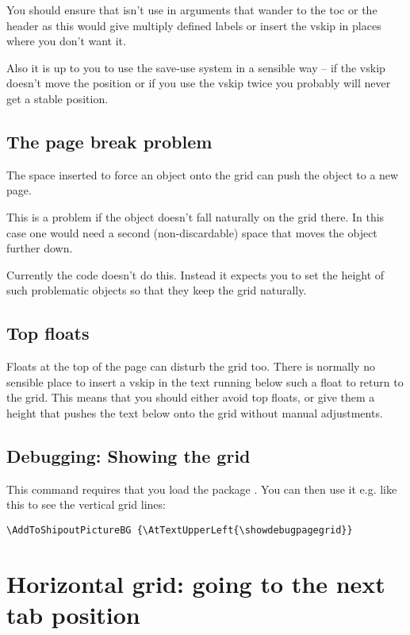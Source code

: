 \documentclass[twoside,parskip=half-,fontsize=12pt,egregdoesnotlikesansseriftitles,headings=normal]{scrartcl}
\begin{document}
You should ensure that  isn't use in arguments that wander to the toc or the header as this would give multiply defined labels or insert the vskip in places where you don't want it.

Also it is up to you to use the save-use system in a sensible way -- if the vskip doesn't move the position or if you use the vskip twice you probably will never get a stable position.

\subsection{The page break problem}\label{sec:pagebreak}

The space inserted to force an object onto the grid can push the object to a new page.

This is a problem if the object doesn't fall naturally on the grid there. In this case one would need a second (non-discardable) space that moves the object further down.

Currently the code doesn't do this. Instead it expects you to set the height of such problematic objects so that they keep the grid naturally.


\subsection{Top floats}

Floats at the top of the page can disturb the grid too.  There is normally no sensible place to insert a vskip in the text running below such a float to return to the grid. This means that you should either avoid top floats, or give them a height that pushes the text below onto the grid without manual adjustments.

\subsection{Debugging: Showing the grid}

\DescribeMacro\showdebugpagegrid

This command requires that you load the package . You can then use it e.g. like this to see the vertical grid lines:

\begin{lstlisting}
\AddToShipoutPictureBG {\AtTextUpperLeft{\showdebugpagegrid}}
\end{lstlisting}


\section{Horizontal grid: going to the next tab position}\label{sec:nextgridtab}
\end{document}
